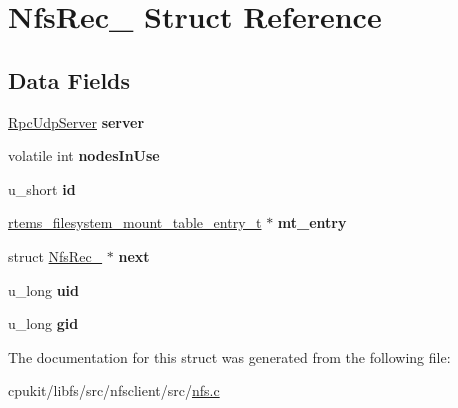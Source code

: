 \hypertarget{structNfsRec__}{}\section{Nfs\+Rec\+\_\+ Struct Reference}
\label{structNfsRec__}
\subsection*{Data Fields}
\begin{DoxyCompactItemize}
\item 
\mbox{\label{structNfsRec___a233ed15d5063daf56227cd95acaf0804}} 
\mbox{\hyperlink{structRpcUdpServerRec__}{Rpc\+Udp\+Server}} {\bfseries server}
\item 
\mbox{\label{structNfsRec___a1bc43f82ac80b219f4d4704f0f016b57}} 
volatile int {\bfseries nodes\+In\+Use}
\item 
\mbox{\label{structNfsRec___a53d3eaac58e3e0d397cf03c3bf27eeb8}} 
u\+\_\+short {\bfseries id}
\item 
\mbox{\label{structNfsRec___aa9e892d8bdb97795ceab2c21ec64ee39}} 
\mbox{\hyperlink{structrtems__filesystem__mount__table__entry__tt}{rtems\+\_\+filesystem\+\_\+mount\+\_\+table\+\_\+entry\+\_\+t}} $\ast$ {\bfseries mt\+\_\+entry}
\item 
\mbox{\label{structNfsRec___ab5256a269314b499741f6420af7f18ee}} 
struct \mbox{\hyperlink{structNfsRec__}{Nfs\+Rec\+\_\+}} $\ast$ {\bfseries next}
\item 
\mbox{\label{structNfsRec___a89f2c53c41b0f8e8cd299a4f7b1dd9d5}} 
u\+\_\+long {\bfseries uid}
\item 
\mbox{\label{structNfsRec___a3b02539e715d1c2b6ae6fb23ffe42eac}} 
u\+\_\+long {\bfseries gid}
\end{DoxyCompactItemize}


The documentation for this struct was generated from the following file\+:\begin{DoxyCompactItemize}
\item 
cpukit/libfs/src/nfsclient/src/\mbox{\hyperlink{nfs_8c}{nfs.\+c}}\end{DoxyCompactItemize}
